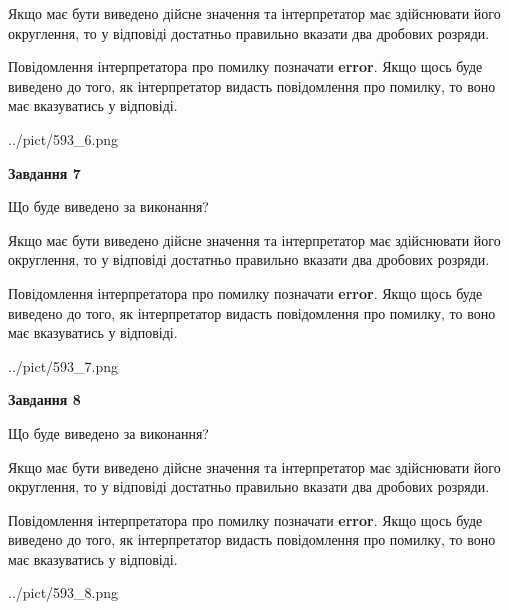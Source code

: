 \documentclass[12pt, ukrainian]{article}
\begin{document}
{\begin {Large}
Якщо має бути виведено дійсне значення та інтерпретатор має здійснювати його округлення, 
то у відповіді достатньо правильно вказати два дробових розряди.

Повідомлення інтерпретатора про помилку позначати \textbf{error}.
Якщо щось буде виведено до того, як інтерпретатор видасть повідомлення про помилку, 
то воно має вказуватись у відповіді. \par

\begin{center}
	{../pict/593_6.png}
\end{center}
\newpage

{\begin {center}\textbf{Завдання 7}\end {center}}\par
Що буде виведено за виконання? \par

Якщо має бути виведено дійсне значення та інтерпретатор має здійснювати його округлення, 
то у відповіді достатньо правильно вказати два дробових розряди.

Повідомлення інтерпретатора про помилку позначати \textbf{error}.
Якщо щось буде виведено до того, як інтерпретатор видасть повідомлення про помилку, 
то воно має вказуватись у відповіді. \par

\begin{center}
	{../pict/593_7.png}
\end{center}
\newpage

{\begin {center}\textbf{Завдання 8}\end {center}}\par
Що буде виведено за виконання? \par

Якщо має бути виведено дійсне значення та інтерпретатор має здійснювати його округлення, 
то у відповіді достатньо правильно вказати два дробових розряди.

Повідомлення інтерпретатора про помилку позначати \textbf{error}.
Якщо щось буде виведено до того, як інтерпретатор видасть повідомлення про помилку, 
то воно має вказуватись у відповіді. \par

\begin{center}
	{../pict/593_8.png}
\end{center}
\newpage


\end{Large}}
\end{document}
